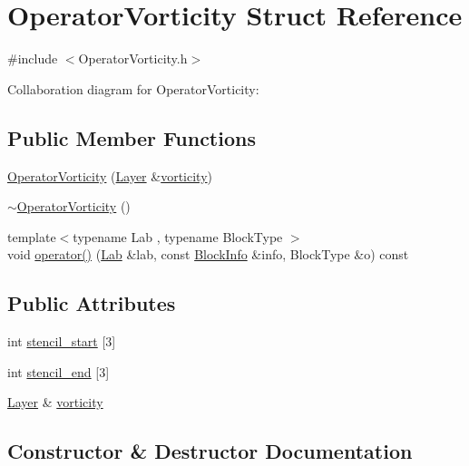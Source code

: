 \hypertarget{struct_operator_vorticity}{}\section{Operator\+Vorticity Struct Reference}
\label{struct_operator_vorticity}


{\ttfamily \#include $<$Operator\+Vorticity.\+h$>$}



Collaboration diagram for Operator\+Vorticity\+:
\subsection*{Public Member Functions}
\begin{DoxyCompactItemize}
\item 
\hyperlink{struct_operator_vorticity_a5f119e3cd343868bce48c0c46865854c}{Operator\+Vorticity} (\hyperlink{struct_layer}{Layer} \&\hyperlink{struct_operator_vorticity_a8612e8747d5eb6a0ab2f8064e9ba1ba7}{vorticity})
\item 
\hyperlink{struct_operator_vorticity_af42ecc8472869fd7ae95d1506f29f39d}{$\sim$\+Operator\+Vorticity} ()
\item 
{\footnotesize template$<$typename Lab , typename Block\+Type $>$ }\\void \hyperlink{struct_operator_vorticity_a3e677de987ab03e9a31a6978fd46b512}{operator()} (\hyperlink{_definitions_8h_ad6f951af9a2a6ebc1975404882b34314}{Lab} \&lab, const \hyperlink{struct_block_info}{Block\+Info} \&info, Block\+Type \&o) const 
\end{DoxyCompactItemize}
\subsection*{Public Attributes}
\begin{DoxyCompactItemize}
\item 
int \hyperlink{struct_operator_vorticity_ae08cd818e465208f30592d422cabe9f0}{stencil\+\_\+start} \mbox{[}3\mbox{]}
\item 
int \hyperlink{struct_operator_vorticity_af87676e305aa2c937a2ba0e7ee3882f1}{stencil\+\_\+end} \mbox{[}3\mbox{]}
\item 
\hyperlink{struct_layer}{Layer} \& \hyperlink{struct_operator_vorticity_a8612e8747d5eb6a0ab2f8064e9ba1ba7}{vorticity}
\end{DoxyCompactItemize}


\subsection{Constructor \& Destructor Documentation}
\hypertarget{struct_operator_vorticity_a5f119e3cd343868bce48c0c46865854c}{}
